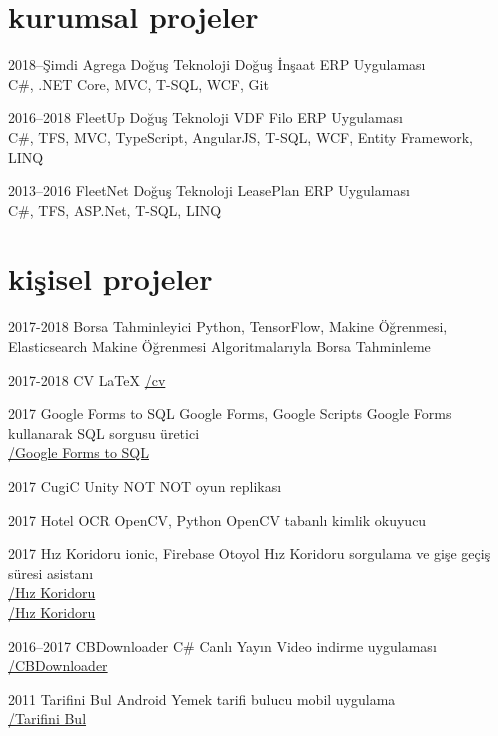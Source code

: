 \documentclass[]{../friggeri-cv} %
\begin{document}
\section{kurumsal projeler}

\begin{entrylist}

\entry
{2018--Şimdi}
{Agrega}
{Doğuş Teknoloji}
{Doğuş İnşaat ERP Uygulaması
\\C\#, .NET Core, MVC, T-SQL, WCF, Git}

\entry
{2016--2018}
{FleetUp}
{Doğuş Teknoloji}
{VDF Filo ERP Uygulaması
\\C\#, TFS, MVC, TypeScript, AngularJS, T-SQL, WCF, Entity Framework, LINQ}

\entry
{2013--2016}
{FleetNet}
{Doğuş Teknoloji}
{LeasePlan ERP Uygulaması
\\C\#, TFS, ASP.Net, T-SQL, LINQ}

\end{entrylist}

\section{kişisel projeler}

\begin{entrylist}

\entry
{2017-2018}
{Borsa Tahminleyici}
{Python, TensorFlow, Makine Öğrenmesi, Elasticsearch}
{Makine Öğrenmesi Algoritmalarıyla Borsa Tahminleme}

\entry
{2017-2018}
{CV}
{\LaTeX}
{\href{https://github.com/suphero/cv}{\faGithub/cv}}

\entry
{2017}
{Google Forms to SQL}
{Google Forms, Google Scripts}
{Google Forms kullanarak SQL sorgusu üretici
\\\href{https://github.com/suphero/Google-Forms-to-SQL}{\faGithub/Google Forms to SQL}}

\entry
{2017}
{CugiC}
{Unity}
{NOT NOT oyun replikası}

\entry
{2017}
{Hotel OCR}
{OpenCV, Python}
{OpenCV tabanlı kimlik okuyucu}

\entry
{2017}
{Hız Koridoru}
{ionic, Firebase}
{Otoyol Hız Koridoru sorgulama ve gişe geçiş süresi asistanı
\\\href{https://play.google.com/store/apps/details?id=com.harunsokullu.speedcorridor}{\faAndroid/Hız Koridoru}
\\\href{https://itunes.apple.com/tr/app/h\%C4\%B1z-koridoru/id1265151812}{\faApple/Hız Koridoru}}

\entry
{2016--2017}
{CBDownloader}
{C\#}
{Canlı Yayın Video indirme uygulaması
\\\href{https://github.com/suphero/CBDownloader}{\faGithub/CBDownloader}}

\entry
{2011}
{Tarifini Bul}
{Android}
{Yemek tarifi bulucu mobil uygulama
\\\href{https://play.google.com/store/apps/details?id=com.tarifinibul}{\faAndroid/Tarifini Bul}}

\end{entrylist}
\end{document}
